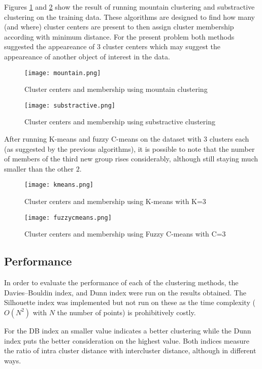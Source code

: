 Figures \ref{fig:mountain} and \ref{fig:substractive} show the result of running
mountain clustering and substractive clustering on the training data. These
algorithms are designed to find how many (and where) cluster centers are
present to then assign cluster membership according with minimum
distance. For the present problem both methods suggested the appeareance of 3
cluster centers which may suggest the appeareance of another object of interest
in the data.

\begin{figure}[t]
    \texttt{[image: mountain.png]}
    \caption{Cluster centers and membership using mountain clustering
    \label{fig:mountain}}
\end{figure}
\begin{figure}[t]
    \texttt{[image: substractive.png]}
    \caption{Cluster centers and membership using substractive clustering
    \label{fig:substractive}}
\end{figure}

After running K-means and fuzzy C-means on the dataset with $3$ clusters each
(as suggested by the previous algorithms), it is possible to note that the
number of members of the third new group rises considerably, although still
staying much smaller than the other $2$.

\begin{figure}[t]
    \texttt{[image: kmeans.png]}
    \caption{Cluster centers and membership using K-means with K=3
    \label{fig:kmeans}}
\end{figure}
\begin{figure}[t]
    \texttt{[image: fuzzycmeans.png]}
    \caption{Cluster centers and membership using Fuzzy C-means with C=3 
    \label{fig:fuzzycmeans}}
\end{figure}

\subsection{Performance}
In order to evaluate the performance of each of the clustering methods, the 
Davies–Bouldin index, and Dunn index were run on the results obtained. The
Silhouette index was implemented but not run on these as the time complexity
($O(N^2)$ with $N$ the number of points) is prohibitively costly. 

For the DB index an smaller value indicates a better clustering while the Dunn
index puts the better consideration on the highest value. Both indices measure
the ratio of intra cluster distance with intercluster distance, although in 
different ways.

